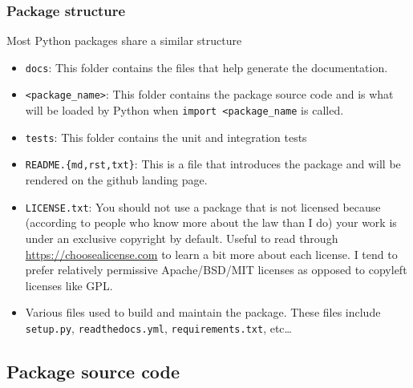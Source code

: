\documentclass[10pt]{beamer}
\begin{document}
  \begin{frame} \frametitle{Package structure}

    {\footnotesize
    Most Python packages share a similar structure

    \begin{itemize}
      \item \texttt{docs}: This folder contains the files that help generate the documentation.
      \item \texttt{<package\_name>}: This folder contains the package source code and is what will
        be loaded by Python when \texttt{import <package\_name} is called.
      \item \texttt{tests}: This folder contains the unit and integration tests
      \item \texttt{README.\{md,rst,txt\}}: This is a file that introduces the package and will be
        rendered on the github landing page.
      \item \texttt{LICENSE.txt}: You should not use a package that is not licensed because
        (according to people who know more about the law than I do) your work is under an
        exclusive copyright by default. Useful to read through \url{https://choosealicense.com}
        to learn a bit more about each license. I tend to prefer relatively permissive Apache/BSD/MIT
        licenses as opposed to copyleft licenses like GPL.
      \item Various files used to build and maintain the package. These files include
        \texttt{setup.py}, \texttt{readthedocs.yml}, \texttt{requirements.txt}, etc\dots
    \end{itemize}

    }

  \end{frame}

  \subsection{Package source code}
\end{document}
